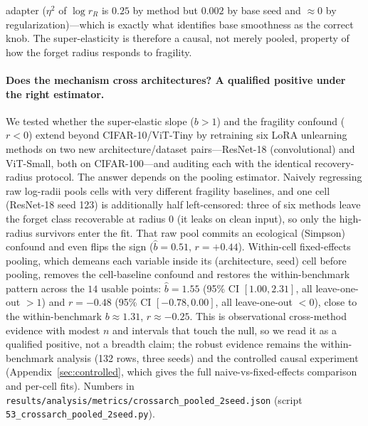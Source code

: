 \documentclass{article}
\begin{document}
adapter ($\eta^2$ of $\log r_R$ is $0.25$ by method but $0.002$ by base seed and $\approx 0$ by regularization)---which is exactly what identifies base smoothness as the correct knob. The super-elasticity is therefore a causal, not merely pooled, property of how the forget radius responds to fragility.

\paragraph{Does the mechanism cross architectures? A qualified positive under the right estimator.} We tested whether the super-elastic slope ($b>1$) and the fragility confound ($r<0$) extend beyond CIFAR-10/ViT-Tiny by retraining six LoRA unlearning methods on two new architecture/dataset pairs---ResNet-18 (convolutional) and ViT-Small, both on CIFAR-100---and auditing each with the identical recovery-radius protocol. The answer depends on the pooling estimator. Naively regressing raw log-radii pools cells with very different fragility baselines, and one cell (ResNet-18 seed 123) is additionally half left-censored: three of six methods leave the forget class recoverable at radius $0$ (it leaks on clean input), so only the high-radius survivors enter the fit. That raw pool commits an ecological (Simpson) confound and even flips the sign ($\hat b=0.51$, $r=+0.44$). Within-cell fixed-effects pooling, which demeans each variable inside its (architecture, seed) cell before pooling, removes the cell-baseline confound and restores the within-benchmark pattern across the $14$ usable points: $\hat b=1.55$ (95\% CI $[1.00,2.31]$, all leave-one-out $>1$) and $r=-0.48$ (95\% CI $[-0.78,0.00]$, all leave-one-out $<0$), close to the within-benchmark $b\approx1.31$, $r\approx-0.25$. This is observational cross-method evidence with modest $n$ and intervals that touch the null, so we read it as a qualified positive, not a breadth claim; the robust evidence remains the within-benchmark analysis (132 rows, three seeds) and the controlled causal experiment (Appendix~\ref{sec:controlled}, which gives the full naive-vs-fixed-effects comparison and per-cell fits). Numbers in \texttt{results/analysis/metrics/crossarch\_pooled\_2seed.json} (script \texttt{53\_crossarch\_pooled\_2seed.py}).
\end{document}

